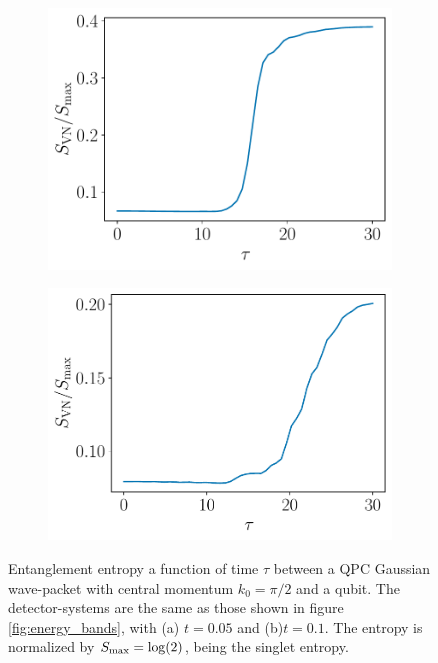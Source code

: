 \documentclass{article}
\begin{document}
\begin{figure}[h]
    \centering
    \begin{subfigure}[b]{0.35\textwidth}
        \includegraphics[width=\textwidth]{figures/report_08_2025/entropy_time_exact_Lqpc=60_Omega=0.4_t=0.05.pdf}
        \caption{}
    \end{subfigure}
    \hspace{0.001\textwidth}
    \begin{subfigure}[b]{0.35\textwidth}
        \includegraphics[width=\textwidth]{figures/report_08_2025/entropy_time_exact_Lqpc=60_Omega=0.4_t=0.1.pdf}
        \caption{}
    \end{subfigure}
    \caption{Entanglement entropy a function of time $\tau$ between a QPC Gaussian wave-packet with central momentum $k_0 = \pi/2$ and a qubit. The detector-systems are the same as those shown in figure \ref{fig:energy_bands}, with (a) $t=0.05$ and (b)$t=0.1$. The entropy is normalized by $S_{\rm{max}} = \log(2)$, being the singlet entropy.}
    \label{fig:entropy_in_time}
\end{figure}
\end{document}
